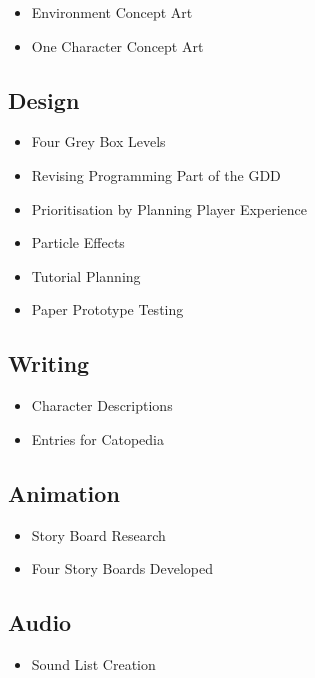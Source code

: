 \documentclass{article}
\begin{document}
\begin{itemize}
    \item Environment Concept Art
    \item One Character Concept Art
\end{itemize}

\subsection{Design}
\begin{itemize}
    \item Four Grey Box Levels
    \item Revising Programming Part of the GDD
    \item Prioritisation by Planning Player Experience
    \item Particle Effects
    \item Tutorial Planning
    \item Paper Prototype Testing
\end{itemize}

\subsection{Writing}

\begin{itemize}
    \item Character Descriptions
    \item Entries for Catopedia
\end{itemize}

\subsection{Animation}

\begin{itemize}
    \item Story Board Research
    \item Four Story Boards Developed
\end{itemize}

\subsection{Audio}
\begin{itemize}
    \item Sound List Creation
\end{itemize}
\end{document}
